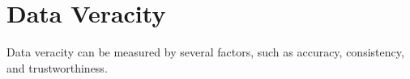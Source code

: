 \chapter{Data Veracity}

Data veracity can be measured by several factors, such as accuracy, consistency, and trustworthiness.